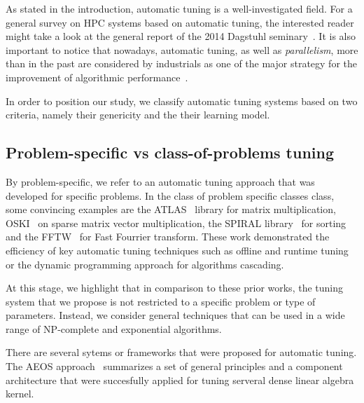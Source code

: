 \documentclass[10pt, conference, compsocconf]{IEEEtran}
\begin{document}
As stated in the introduction, automatic tuning  is a well-investigated field. For a general survey on HPC systems based on 
automatic tuning, the interested reader might take a look at the general report of the 2014 Dagstuhl seminary~\cite{benkner_et_al:DR:2014:4423}. 
It is also important to notice that nowadays, automatic tuning, as well as  {\it parallelism}, more than in the past 
are considered by industrials as one of the major strategy for the improvement of algorithmic performance~\cite{Oracle}.


In order to position our study, we classify automatic tuning systems based on two criteria, namely 
their genericity and the their learning model.


\subsection{Problem-specific vs class-of-problems tuning}

By problem-specific, we refer to an automatic tuning approach that was
developed for specific problems.  In the class of problem specific classes
class, some convincing examples are the ATLAS~\cite{ATLAS} library for matrix
multiplication, OSKI~\cite{Vuduc:2005zi} on sparse matrix vector
multiplication,  the SPIRAL library~\cite{Spiral} for sorting and the
FFTW~\cite{FFTW}  for Fast Fourrier transform. These work demonstrated the
efficiency of key automatic tuning techniques such as offline and runtime
tuning or the dynamic programming approach for algorithms cascading.


At this stage, we highlight that in comparison to these prior
works, the tuning system that we propose is not restricted to a specific
problem or type of parameters. Instead, we consider general techniques that can
be used in a wide range of NP-complete and exponential algorithms.

There are several sytems or frameworks that were proposed for automatic tuning.
The AEOS approach~\cite{AEOS} summarizes a set of general principles and a
component architecture that were succesfully applied for tuning  serveral dense
linear algebra kernel.
\end{document}
